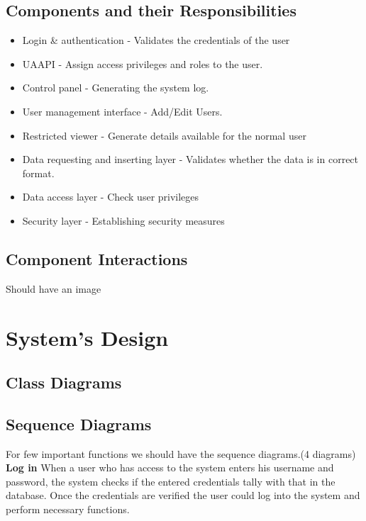 \documentclass[a4paper,beamer]{article}
\begin{document}
	\subsection{Components and their Responsibilities}
	\begin{itemize}
		\item Login \& authentication - Validates the credentials of the user
		\item UAAPI - Assign access privileges and roles to the user.
		\item Control panel - Generating the system log.
		\item User management interface - Add/Edit Users.
		
		\item Restricted viewer - Generate details available for the normal user
		\item Data requesting and inserting layer - Validates whether the data is in correct format.
		\item Data access layer - Check user privileges
		\item Security layer - Establishing security measures
	\end{itemize}
	
	\subsection{Component Interactions}
	Should have an image
	
	\newpage
	
	\section{System's Design}
	
	\subsection{Class Diagrams}
	
	\subsection{Sequence Diagrams}
	For few important functions we should have the sequence diagrams.(4 diagrams)
	\textbf{Log in}\newline
	When a user who has access to the system enters his username and password, the system checks if the entered credentials tally with that in the database. Once the credentials are verified the user could log into the system and perform necessary functions.\newline
	
\end{document}
